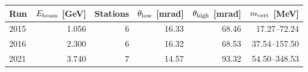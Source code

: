 \begin{tabular}{lrrrrr}\toprule
Run & $E_{\rm beam}$ [GeV] & Stations & $\theta_{\rm low}$ [mrad] & $\theta_{\rm high}$ [mrad] & $m_{\rm vert}$ [MeV]\\\midrule
2015 & 1.056 & 6 & 16.33 & 68.46 & 17.27--72.24\\
2016 & 2.300 & 6 & 16.32 & 68.53 & 37.54--157.50\\
2021 & 3.740 & 7 & 14.57 & 93.32 & 54.50--348.53\\
\bottomrule\end{tabular}
